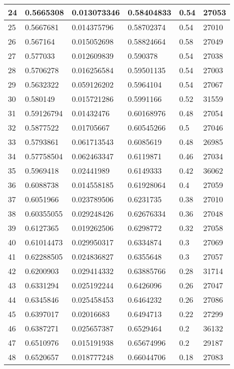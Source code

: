 \begin{longtable}{|l|l|l|l|l|l|}
24 & 0.5665308 & 0.013073346 & 0.58404833 & 0.54 & 27053 \\ \hline 
25 & 0.5667681 & 0.014375796 & 0.58702374 & 0.54 & 27010 \\ \hline 
26 & 0.567164 & 0.015052698 & 0.58824664 & 0.58 & 27049 \\ \hline 
27 & 0.577033 & 0.012609839 & 0.590378 & 0.54 & 27038 \\ \hline 
28 & 0.5706278 & 0.016256584 & 0.59501135 & 0.54 & 27003 \\ \hline 
29 & 0.5632322 & 0.059126202 & 0.5964104 & 0.54 & 27067 \\ \hline 
30 & 0.580149 & 0.015721286 & 0.5991166 & 0.52 & 31559 \\ \hline 
31 & 0.59126794 & 0.01432476 & 0.60168976 & 0.48 & 27054 \\ \hline 
32 & 0.5877522 & 0.01705667 & 0.60545266 & 0.5 & 27046 \\ \hline 
33 & 0.5793861 & 0.061713543 & 0.6085619 & 0.48 & 26985 \\ \hline 
34 & 0.57758504 & 0.062463347 & 0.6119871 & 0.46 & 27034 \\ \hline 
35 & 0.5969418 & 0.02441989 & 0.6149333 & 0.42 & 36062 \\ \hline 
36 & 0.6088738 & 0.014558185 & 0.61928064 & 0.4 & 27059 \\ \hline 
37 & 0.6051966 & 0.023789506 & 0.6231735 & 0.38 & 27010 \\ \hline 
38 & 0.60355055 & 0.029248426 & 0.62676334 & 0.36 & 27048 \\ \hline 
39 & 0.6127365 & 0.019262506 & 0.6298772 & 0.32 & 27058 \\ \hline 
40 & 0.61014473 & 0.029950317 & 0.6334874 & 0.3 & 27069 \\ \hline 
41 & 0.62288505 & 0.024836827 & 0.6355648 & 0.3 & 27057 \\ \hline 
42 & 0.6200903 & 0.029414332 & 0.63885766 & 0.28 & 31714 \\ \hline 
43 & 0.6331294 & 0.025192244 & 0.6426096 & 0.26 & 27047 \\ \hline 
44 & 0.6345846 & 0.025458453 & 0.6464232 & 0.26 & 27086 \\ \hline 
45 & 0.6397017 & 0.02016683 & 0.6494713 & 0.22 & 27299 \\ \hline 
46 & 0.6387271 & 0.025657387 & 0.6529464 & 0.2 & 36132 \\ \hline 
47 & 0.6510976 & 0.015191938 & 0.65674996 & 0.2 & 29187 \\ \hline 
48 & 0.6520657 & 0.018777248 & 0.66044706 & 0.18 & 27083 \\ \hline 

\end{longtable}
